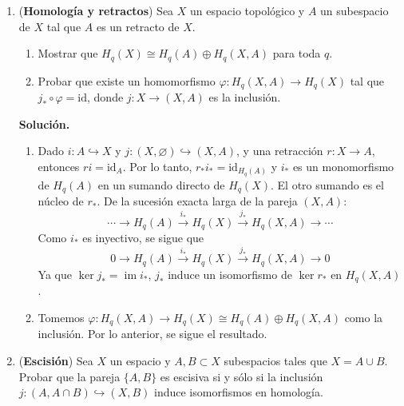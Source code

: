 \documentclass[11pt,a4paper]{article}
\theoremstyle{plain}
\theoremstyle{definition}
\theoremstyle{remark}
\DeclareMathOperator{\im}{im}
\begin{document}
\begin{enumerate}[label=\arabic*.,leftmargin=*]
\item (\textbf{Homología y retractos}) Sea $X$ un espacio topológico y $A$
un subespacio de $X$ tal que $A$ es un retracto de $X$.
\begin{enumerate}[label=\alph*)]
\item Mostrar que $H_q(X)\cong H_q(A)\oplus H_q(X,A)$ para toda $q$.
\item Probar que existe un homomorfismo $\varphi:H_q(X,A)\to H_q(X)$ tal
que $j_*\circ\varphi=\mathrm{id}$, donde $j:X\to(X,A)$ es la inclusión.
\end{enumerate}

\noindent\textbf{Solución.}
\begin{enumerate}[label=\alph*)]
\item Dado $i:A\hookrightarrow X$ y $j:(X,\varnothing)\hookrightarrow(X,A)$,
y una retracción $r:X\to A$, entonces $ri=\mathrm{id}_A$. Por lo tanto,
$r_*i_*=\mathrm{id}_{H_q(A)}$ y $i_*$ es un monomorfismo de $H_q(A)$ en un
sumando directo de $H_q(X)$. El otro sumando es el núcleo de $r_*$. De la
sucesión exacta larga de la pareja $(X,A)$:
\[
\cdots\to H_q(A)\xrightarrow{i_*}H_q(X)\xrightarrow{j_*}H_q(X,A)\to\cdots
\]
Como $i_*$ es inyectivo, se sigue que
\[
0\to H_q(A)\xrightarrow{i_*}H_q(X)\xrightarrow{j_*}H_q(X,A)\to0
\]
Ya que $\ker j_*=\im i_*$, $j_*$ induce un isomorfismo de $\ker r_*$ en
$H_q(X,A)$.
\item Tomemos $\varphi:H_q(X,A)\to H_q(X)\cong H_q(A)\oplus H_q(X,A)$ como
la inclusión. Por lo anterior, se sigue el resultado.
\end{enumerate}

\item (\textbf{Escisión}) Sea $X$ un espacio y $A,B\subset X$ subespacios
tales que $X=A\cup B$. Probar que la pareja $\{A,B\}$ es escisiva si y sólo
si la inclusión $j:(A,A\cap B)\hookrightarrow(X,B)$ induce isomorfismos en
homología.


\end{enumerate}
\end{document}
